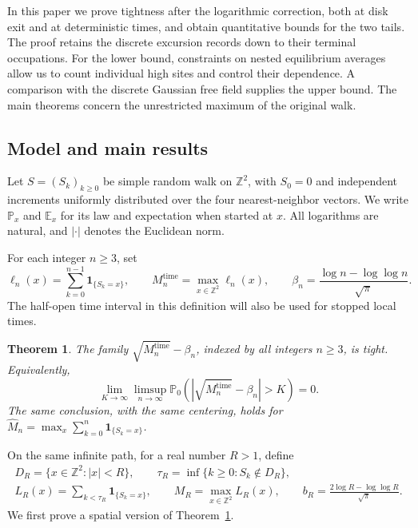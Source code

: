 \documentclass[11pt,a4paper]{article}
\numberwithin{equation}{section}
\newtheorem{theorem}{Theorem}[section]
\theoremstyle{remark}
\begin{document}
In this paper we prove tightness after the logarithmic correction, both at disk exit and at deterministic times, and obtain quantitative bounds for the two tails. The proof retains the discrete excursion records down to their terminal occupations. For the lower bound, constraints on nested equilibrium averages allow us to count individual high sites and control their dependence. A comparison with the discrete Gaussian free field supplies the upper bound. The main theorems concern the unrestricted maximum of the original walk.

\subsection{Model and main results}\label{sec:results}
Let $S=(S_k)_{k\ge0}$ be simple random walk on $\mathbb Z^2$, with $S_0=0$ and independent increments uniformly distributed over the four nearest-neighbor vectors. We write $\mathbb P_x$ and $\mathbb E_x$ for its law and expectation when started at $x$. All logarithms are natural, and $|\cdot|$ denotes the Euclidean norm.

For each integer $n\ge3$, set
\begin{equation}\label{eq:1.1}
\ell_n(x)=\sum_{k=0}^{n-1}\mathbf1_{\{S_k=x\}},\qquad
M_n^{\mathrm{time}}=\max_{x\in\mathbb Z^2}\ell_n(x),\qquad
\beta_n=\frac{\log n-\log\log n}{\sqrt\pi}.
\end{equation}
The half-open time interval in this definition will also be used for stopped local times.

\begin{theorem}\label{thm:time}
The family $\sqrt{M_n^{\mathrm{time}}}-\beta_n$, indexed by all integers $n\ge3$, is tight. Equivalently,
\begin{equation}\label{eq:1.2}
\lim_{K\to\infty}\limsup_{n\to\infty}
\mathbb P_0\!\left(\left|\sqrt{M_n^{\mathrm{time}}}-\beta_n\right|>K\right)=0.
\end{equation}
The same conclusion, with the same centering, holds for
$\widehat M_n=\max_x\sum_{k=0}^{n}\mathbf1_{\{S_k=x\}}$.
\end{theorem}

On the same infinite path, for a real number $R>1$, define
\begin{equation}\label{eq:1.3}
\begin{gathered}
D_R=\{x\in\mathbb Z^2:|x|<R\},\qquad
\tau_R=\inf\{k\ge0:S_k\notin D_R\},\\
L_R(x)=\sum_{k<\tau_R}\mathbf1_{\{S_k=x\}},\qquad
M_R=\max_{x\in\mathbb Z^2}L_R(x),\qquad
b_R=\frac{2\log R-\log\log R}{\sqrt\pi}.
\end{gathered}
\end{equation}
We first prove a spatial version of Theorem~\ref{thm:time}.
\end{document}
